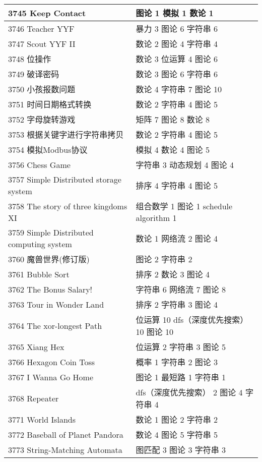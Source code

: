 \begin{longtable}{| p{} | p{} |}
 3745 Keep Contact  & 图论 1 模拟 1 数论 1 \\ \hline
 3746 Teacher YYF  & 暴力 3 图论 6 字符串 6 \\ \hline
 3747 Scout YYF II  & 数论 2 图论 4 字符串 4 \\ \hline
 3748 位操作  & 数论 3 位运算 4 图论 6 \\ \hline
 3749 破译密码  & 数论 3 图论 6 字符串 6 \\ \hline
 3750 小孩报数问题  & 数论 4 字符串 7 图论 10 \\ \hline
 3751 时间日期格式转换  & 数论 2 字符串 4 图论 5 \\ \hline
 3752 字母旋转游戏  & 矩阵 7 图论 8 数论 8 \\ \hline
 3753 根据关键字进行字符串拷贝  & 数论 2 字符串 4 图论 5 \\ \hline
 3754 模拟Modbus协议  & 模拟 4 数论 4 图论 5 \\ \hline
 3756 Chess Game  & 字符串 3 动态规划 4 图论 4 \\ \hline
 3757 Simple Distributed storage system  & 排序 4 字符串 4 图论 5 \\ \hline
 3758 The story of three kingdoms XI  & 组合数学 1 图论 1 schedule algorithm 1 \\ \hline
 3759 Simple Distributed computing system  & 数论 1 网络流 2 图论 4 \\ \hline
 3760 魔兽世界(修订版)  & 图论 2 字符串 2 \\ \hline
 3761 Bubble Sort  & 排序 2 数论 3 图论 4 \\ \hline
 3762 The Bonus Salary!  & 字符串 6 网络流 7 图论 8 \\ \hline
 3763 Tour in Wonder Land  & 排序 2 字符串 3 图论 4 \\ \hline
 3764 The xor-longest Path  & 位运算 10 dfs（深度优先搜索） 10 图论 10 \\ \hline
 3765 Xiang Hex  & 位运算 2 字符串 3 图论 5 \\ \hline
 3766 Hexagon Coin Toss  & 概率 1 字符串 2 图论 3 \\ \hline
 3767 I Wanna Go Home  & 图论 1 最短路 1 字符串 1 \\ \hline
 3768 Repeater  & dfs（深度优先搜索） 2 图论 4 字符串 4 \\ \hline
 3771 World Islands  & 数论 1 图论 2 字符串 2 \\ \hline
 3772 Baseball of Planet Pandora  & 数论 4 图论 5 字符串 5 \\ \hline
 3773 String-Matching Automata  & 图匹配 3 图论 3 字符串 3 \\ \hline

\end{longtable}
